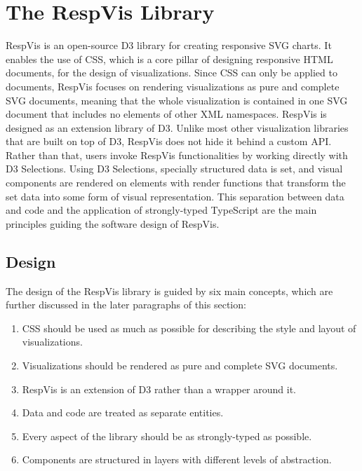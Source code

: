 \chapter{The RespVis Library}
\label{chap:RespVis}

RespVis is an open-source D3 library for creating responsive SVG charts.
It enables the use of CSS, which is a core pillar of designing responsive HTML documents, for the design of visualizations.
Since CSS can only be applied to documents, RespVis focuses on rendering visualizations as pure and complete SVG documents, meaning that the whole visualization is contained in one SVG document that includes no elements of other XML namespaces.
RespVis is designed as an extension library of D3. 
Unlike most other visualization libraries that are built on top of D3, RespVis does not hide it behind a custom API.
Rather than that, users invoke RespVis functionalities by working directly with D3 Selections. 
Using D3 Selections, specially structured data is set, and visual components are rendered on elements with render functions that transform the set data into some form of visual representation.
This separation between data and code and the application of strongly-typed TypeScript are the main principles guiding the software design of RespVis.

\section{Design}
\label{sec:Design}

The design of the RespVis library is guided by six main concepts, which are further discussed in the later paragraphs of this section:

\begin{enumerate}
\item CSS should be used as much as possible for describing the style and layout of visualizations.
\item Visualizations should be rendered as pure and complete SVG documents.
\item RespVis is an extension of D3 rather than a wrapper around it.
\item Data and code are treated as separate entities.
\item Every aspect of the library should be as strongly-typed as possible.
\item Components are structured in layers with different levels of abstraction.
\end{enumerate}

